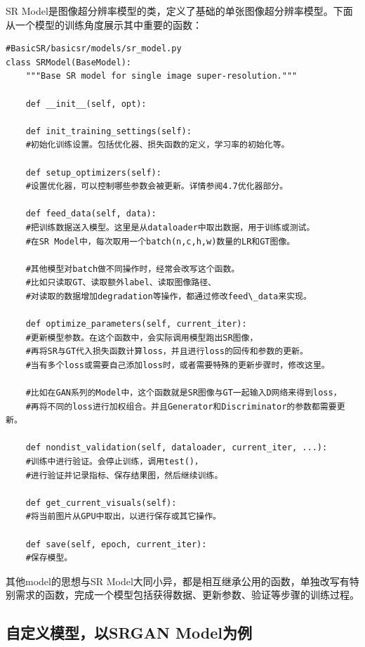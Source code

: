 \documentclass[../main.tex]{subfiles}
\begin{document}
SR Model是图像超分辨率模型的类，定义了基础的单张图像超分辨率模型。下面从一个模型的训练角度展示其中重要的函数：

\begin{verbatim}
#BasicSR/basicsr/models/sr_model.py
class SRModel(BaseModel):
    """Base SR model for single image super-resolution."""

    def __init__(self, opt):
        
    def init_training_settings(self):
    #初始化训练设置。包括优化器、损失函数的定义，学习率的初始化等。
    
    def setup_optimizers(self):
    #设置优化器，可以控制哪些参数会被更新。详情参阅4.7优化器部分。
       
    def feed_data(self, data):
    #把训练数据送入模型。这里是从dataloader中取出数据，用于训练或测试。
    #在SR Model中，每次取用一个batch(n,c,h,w)数量的LR和GT图像。

    #其他模型对batch做不同操作时，经常会改写这个函数。
    #比如只读取GT、读取额外label、读取图像路径、
    #对读取的数据增加degradation等操作，都通过修改feed\_data来实现。
       
    def optimize_parameters(self, current_iter):
    #更新模型参数。在这个函数中，会实际调用模型跑出SR图像，
    #再将SR与GT代入损失函数计算loss，并且进行loss的回传和参数的更新。
    #当有多个loss或需要自己添加loss时，或者需要特殊的更新步骤时，修改这里。
   
    #比如在GAN系列的Model中，这个函数就是SR图像与GT一起输入D网络来得到loss，
    #再将不同的loss进行加权组合。并且Generator和Discriminator的参数都需要更新。

    def nondist_validation(self, dataloader, current_iter, ...):
    #训练中进行验证。会停止训练，调用test()，
    #进行验证并记录指标、保存结果图，然后继续训练。

    def get_current_visuals(self):
    #将当前图片从GPU中取出，以进行保存或其它操作。
        
    def save(self, epoch, current_iter):
    #保存模型。
\end{verbatim}

其他model的思想与SR Model大同小异，都是相互继承公用的函数，单独改写有特别需求的函数，完成一个模型包括获得数据、更新参数、验证等步骤的训练过程。


\subsection{自定义模型，以SRGAN Model为例}
\end{document}
